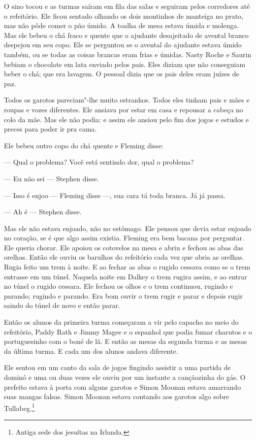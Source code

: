 O sino tocou e as turmas saíram em fila das salas e seguiram pelos
corredores até o refeitório. Ele ficou sentado olhando os dois
montinhos de manteiga no prato, mas não pôde comer o pão úmido. A
toalha de mesa estava úmida e molenga. Mas ele bebeu o chá fraco e
quente que o ajudante desajeitado de avental branco despejou em seu
copo. Ele se perguntou se o avental do ajudante estava úmido também, ou
se todas as coisas brancas eram frias e úmidas. Nasty Roche e Saurin
bebiam o chocolate em lata enviado pelos pais. Eles diziam que não
conseguiam beber o chá; que era lavagem. O pessoal dizia que os pais
deles eram juízes de paz.

Todos os garotos pareciam"-lhe muito estranhos. Todos eles tinham pais e
mães e roupas e vozes diferentes. Ele ansiava por estar em casa e
repousar a cabeça no colo da mãe. Mas ele não podia: e assim ele ansiou
pelo fim dos jogos e estudos e preces para poder ir pra cama. 

Ele bebeu outro copo do chá quente e Fleming disse:

 --- Qual o problema? Você está sentindo dor, qual o problema?

 --- Eu não sei --- Stephen disse.

 --- Isso é enjoo --- Fleming disse ---, sua cara tá toda branca. Já já passa.

 --- Ah é --- Stephen disse.

Mas ele não estava enjoado, não no estômago. Ele pensou que devia estar
enjoado no coração, se é que algo assim existia. Fleming era bem bacana
por perguntar. Ele queria chorar. Ele apoiou os cotovelos na mesa e
abriu e fechou as abas das orelhas. Então ele ouviu os barulhos do
refeitório cada vez que abria as orelhas. Rugia feito um trem à noite.
E ao fechar as abas o rugido cessava como se o trem entrasse em um
túnel. Naquela noite em Dalkey o trem rugira assim, e ao entrar no
túnel o rugido cessara. Ele fechou os olhos e o trem continuou, rugindo
e parando; rugindo e parando. Era bom ouvir o trem rugir e parar e
depois rugir saindo do túnel de novo e então parar.

Então os alunos da primeira turma começaram a vir pelo capacho no meio
do refeitório, Paddy Rath e Jimmy Magee e o espanhol que podia fumar
charutos e o portuguesinho com o boné de lã. E então as mesas da
segunda turma e as mesas da última turma. E cada um dos alunos andava
diferente.

Ele sentou em um canto da sala de jogos fingindo assistir a uma partida
de dominó e uma ou duas vezes ele ouviu por um instante a cançãozinha
do gás. O prefeito estava à porta com alguns garotos e Simon Moonan
estava amarrando suas mangas falsas. Simon Moonan estava contando aos
garotos algo sobre Tullabeg.\footnote{ Antiga sede dos jesuítas na
Irlanda.}


